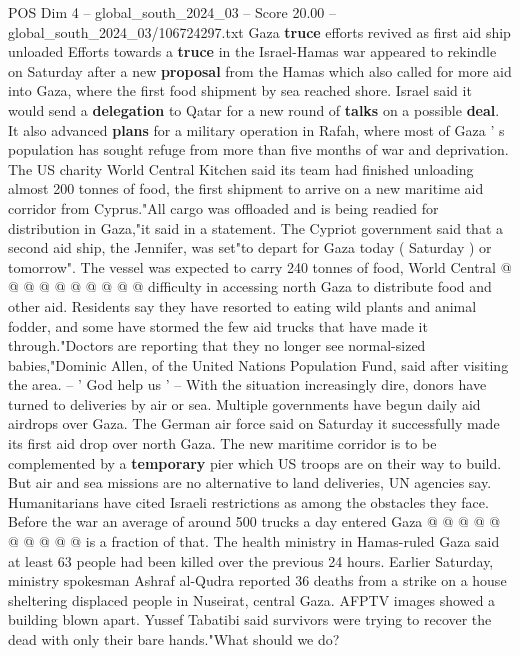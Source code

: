\begin{textsample}{POS Dim 4 – global\_south\_2024\_03 – Score 20.00 – global\_south\_2024\_03/106724297.txt}  \label{ex:f4_pos_105}
Gaza \textbf{truce} efforts revived as first aid ship unloaded Efforts towards a \textbf{truce} in the Israel-Hamas war appeared to rekindle on Saturday after a new \textbf{proposal} from the Hamas which also called for more aid into Gaza, where the first food shipment by sea reached shore.
Israel said it would send a \textbf{delegation} to Qatar for a new round of \textbf{talks} on a possible \textbf{deal}.
It also advanced \textbf{plans} for a military operation in Rafah, where most of Gaza ' s population has sought refuge from more than five months of war and deprivation.
The US charity World Central Kitchen said its team had finished unloading almost 200 tonnes of food, the first shipment to arrive on a new maritime aid corridor from Cyprus."All cargo was offloaded and is being readied for distribution in Gaza,"it said in a statement.
The Cypriot government said that a second aid ship, the Jennifer, was set"to depart for Gaza today ( Saturday ) or tomorrow".
The vessel was expected to carry 240 tonnes of food, World Central @ @ @ @ @ @ @ @ @ @ difficulty in accessing north Gaza to distribute food and other aid.
Residents say they have resorted to eating wild plants and animal fodder, and some have stormed the few aid trucks that have made it through."Doctors are reporting that they no longer see normal-sized babies,"Dominic Allen, of the United Nations Population Fund, said after visiting the area. -- ' God help us ' -- With the situation increasingly dire, donors have turned to deliveries by air or sea.
Multiple governments have begun daily aid airdrops over Gaza.
The German air force said on Saturday it successfully made its first aid drop over north Gaza.
The new maritime corridor is to be complemented by a \textbf{temporary} pier which US troops are on their way to build.
But air and sea missions are no alternative to land deliveries, UN agencies say.
Humanitarians have cited Israeli restrictions as among the obstacles they face.
Before the war an average of around 500 trucks a day entered Gaza @ @ @ @ @ @ @ @ @ @ is a fraction of that.
The health ministry in Hamas-ruled Gaza said at least 63 people had been killed over the previous 24 hours.
Earlier Saturday, ministry spokesman Ashraf al-Qudra reported 36 deaths from a strike on a house sheltering displaced people in Nuseirat, central Gaza.
AFPTV images showed a building blown apart.
Yussef Tabatibi said survivors were trying to recover the dead with only their bare hands."What should we do?

\end{textsample}
